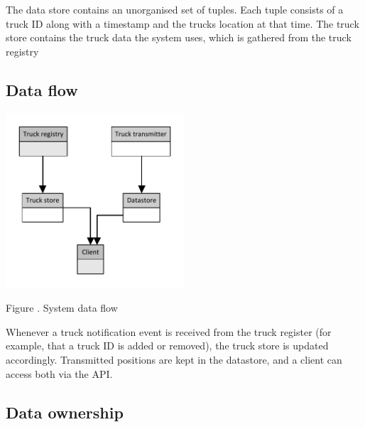 \documentclass[a4paper,11pt]{report}
\newcommand{\mycaption}[1]{
  \addtocounter{figures}{1}
  Figure \arabic{figures}. #1
}
\begin{document}
The data store contains an unorganised set of tuples.  Each tuple
consists of a truck ID along with a timestamp and the trucks location
at that time. The truck store contains the truck data the system uses, which is gathered from the truck registry

\subsection{Data flow}
\label{sec:data-flow}

\begin{center}
  \includegraphics[width=0.5\textwidth]{figures/Data_flow}\\
  \mycaption{System data flow}
\end{center}
Whenever a truck notification event is received from the truck
register (for example, that a truck ID is added or removed), the truck
store is updated accordingly.  Transmitted positions are kept in the
datastore, and a client can access both via the API.

\subsection{Data ownership}
\label{sec:data-ownership}
\end{document}
